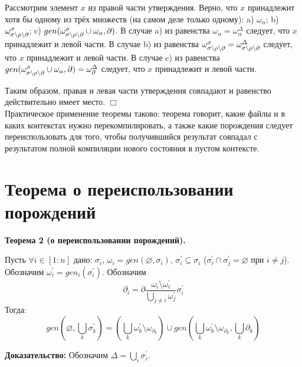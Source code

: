 Рассмотрим элемент $x$ из правой части утверждения. Верно, что $x$ принадлежит хотя бы одному из трёх множеств (на самом деле только одному): a) $\omega_\alpha$; b) $\omega^\sigma_{\sigma\setminus\rho\setminus\partial}$; c) $gen(\omega^\sigma_{\sigma\setminus\rho\setminus\partial} \cup \omega_\alpha, \partial)$. В случае a) из равенства $\omega_\alpha = \omega^\Delta_\alpha$ следует, что $x$ принадлежит и левой части. В случае b) из равенства $\omega^\sigma_{\sigma\setminus\rho\setminus\partial} = \omega^\Delta_{\sigma\setminus\rho\setminus\partial}$ следует, что $x$ принадлежит и левой части. В случае c) из равенства $gen(\omega^\sigma_{\sigma\setminus\rho\setminus\partial} \cup \omega_\alpha, \partial) = \omega^\Delta_\partial$ следует, что $x$ принадлежит и левой части.

Таким образом, правая и левая части утверждения совпадают и равенство действительно имеет место. $\Box$\\

Практическое применение теоремы таково: теорема говорит, какие файлы и в каких контекстах нужно перекомпилировать, а также какие порождения следует переиспользовать для того, чтобы получившийся результат совпадал с результатом полной компиляции нового состояния в пустом контексте.
 
\newpage
\section{Теорема о переиспользовании порождений}

\textbf{Теорема 2 (о переиспользовании порождений).}

Пусть $\forall i \in [1:n]$ дано: $\sigma_i$, $\omega_i = gen(\varnothing, \sigma_i)$, $\sigma_i^\prime \subseteq \sigma_i$ ($\sigma_i^\prime \cap \sigma_j^\prime = \varnothing$ при $i \neq j$). Обозначим $\omega_i^\prime = gen_i(\sigma_i^\prime)$. Обозначим 
$$\partial_i = \partial\dfrac{\omega_i \setminus \omega_i^\prime}{\bigcup\limits_{j \neq i} \omega_j^\prime} \sigma_i^\prime$$
Тогда:
$$gen(\varnothing, \bigcup\limits_k \sigma^\prime_k) = \left( \bigcup\limits_k \omega_k^\prime \setminus \omega_{\partial_k} \right) \cup gen(\bigcup\limits_k \omega_k^\prime \setminus \omega_{\partial_k}, \bigcup\limits_k \partial_k)$$

\newcommand{\sigi}{{\sigma_i}}
\newcommand{\sigpi}{{\sigma^\prime_i}}
\newcommand{\sigpj}{{\sigma^\prime_j}}
\newcommand{\parti}{{\partial_i}}
\newcommand{\alloth}{\bigcup\limits_{j \neq i}\omega^\prime_j}
\newcommand{\rprt}{{\text{п.ч.}}}

\textbf{Доказательство:}
Обозначим $\Delta = \bigcup\limits_i \sigma_i^\prime$.

